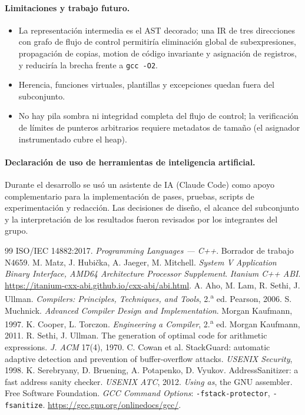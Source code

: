 \documentclass[11pt,a4paper]{article}
\newcommand{\cod}[1]{\texttt{#1}}
\begin{document}
\paragraph{Limitaciones y trabajo futuro.}
\begin{itemize}
  \item La representación intermedia es el AST decorado; una IR de tres direcciones con grafo de flujo de control
        permitiría eliminación global de subexpresiones, propagación de copias, motion de código invariante y
        asignación de registros, y reduciría la brecha frente a \cod{gcc -O2}.
  \item Herencia, funciones virtuales, plantillas y excepciones quedan fuera del subconjunto.
  \item No hay pila sombra ni integridad completa del flujo de control; la verificación de límites de punteros
        arbitrarios requiere metadatos de tamaño (el asignador instrumentado cubre el heap).
\end{itemize}

\paragraph{Declaración de uso de herramientas de inteligencia artificial.}
Durante el desarrollo se usó un asistente de IA (Claude Code) como apoyo complementario para la implementación
de pases, pruebas, scripts de experimentación y redacción. Las decisiones de diseño, el alcance del subconjunto
y la interpretación de los resultados fueron revisados por los integrantes del grupo.

\begin{thebibliography}{99}
 ISO/IEC 14882:2017. \emph{Programming Languages --- C++}. Borrador de trabajo N4659.
 M. Matz, J. Hubi\v{c}ka, A. Jaeger, M. Mitchell. \emph{System V Application Binary Interface, AMD64 Architecture Processor Supplement}.
 \emph{Itanium C++ ABI}. \url{https://itanium-cxx-abi.github.io/cxx-abi/abi.html}.
 A. Aho, M. Lam, R. Sethi, J. Ullman. \emph{Compilers: Principles, Techniques, and Tools}, 2.\textsuperscript{a} ed. Pearson, 2006.
 S. Muchnick. \emph{Advanced Compiler Design and Implementation}. Morgan Kaufmann, 1997.
 K. Cooper, L. Torczon. \emph{Engineering a Compiler}, 2.\textsuperscript{a} ed. Morgan Kaufmann, 2011.
 R. Sethi, J. Ullman. The generation of optimal code for arithmetic expressions. \emph{J. ACM} 17(4), 1970.
 C. Cowan et al. StackGuard: automatic adaptive detection and prevention of buffer-overflow attacks. \emph{USENIX Security}, 1998.
 K. Serebryany, D. Bruening, A. Potapenko, D. Vyukov. AddressSanitizer: a fast address sanity checker. \emph{USENIX ATC}, 2012.
 \emph{Using as}, the GNU assembler. Free Software Foundation.
 \emph{GCC Command Options}: \cod{-fstack-protector}, \cod{-fsanitize}. \url{https://gcc.gnu.org/onlinedocs/gcc/}.
\end{thebibliography}
\end{document}
